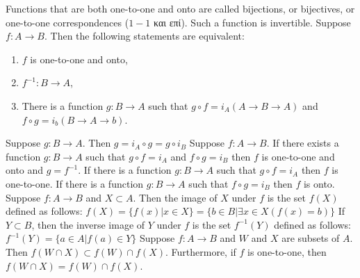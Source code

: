 \documentclass[12pt]{article}
\begin{document}
\begin{flushleft}
\begin{itemize}
	\end{itemize}
	\textbullet \quad Functions that are both one-to-one and onto are called bijections, or bijectives, or one-to-one correspondences ($1-1$ \textgreek{και επί}). Such a function is invertible. \linebreak 
	\textbullet \quad Suppose $f: A\rightarrow B$. Then the following statements are equivalent:  
	\begin{enumerate}
	\item $f$ is one-to-one and onto, 
	\item $f^{-1}: B \rightarrow A$, 
	\item There is a function $g:B\rightarrow A$ such that $g\circ f = i_A (A \rightarrow B \rightarrow A)$ and $f\circ g = i_b (B\rightarrow A \rightarrow b)$. 
	\end{enumerate}
	\textbullet \quad Suppose $g: B \rightarrow A$. Then $g = i_A \circ g = g \circ i_B$ \linebreak 
	\textbullet \quad Suppose $f: A \rightarrow B$. If there exists a function $g: B\rightarrow A$ such that $g \circ f = i_A$ and $f\circ g = i_B$ then $f$ is one-to-one and onto and $g=f^{-1}$. \linebreak 
	\textbullet \quad If there is a function $g:B \rightarrow A$ such that $g\circ f = i_A$ then $f$ is one-to-one. \linebreak 
	\textbullet \quad If there is a function $g:B \rightarrow A$ such that $f\circ g = i_B$ then $f$ is onto. \linebreak 
	\textbullet \quad Suppose $f:A \rightarrow B$ and $X \subset A$. Then the image of $X$ under $f$ is the set $f(X)$ defined as follows: \linebreak $f(X) = \{f(x) | x \in X \} = \{ b \in B | \exists x \in X (f(x) = b) \} $ \linebreak 
	If $Y \subset B$, then the inverse image of $Y$ under $f$ is the set $f^{-1} (Y)$ defined as follows: \linebreak 
	$f^{-1}(Y) = \{ a \in A | f(a) \in Y \}$ \linebreak 
	\textbullet \quad Suppose $f: A \rightarrow B$ and $W$ and $X$ are subsets of $A$. Then $\displaystyle f(W \cap X) \subset f(W) \cap f(X)$. Furthermore, if $f$ is one-to-one, then $\displaystyle f(W\cap X) = f(W) \cap f(X)$. \linebreak 
	

\end{flushleft}
\end{document}
